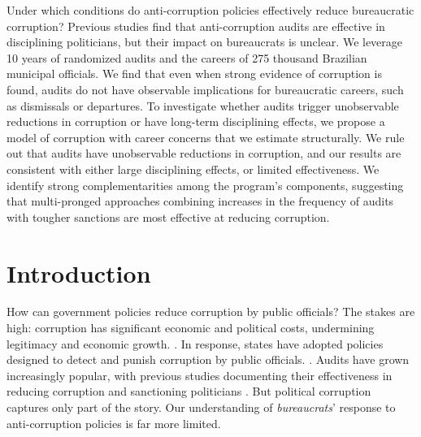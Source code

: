 
    Under which conditions do anti-corruption policies effectively reduce bureaucratic corruption? Previous studies find that anti-corruption audits are effective in disciplining politicians, but their impact on bureaucrats is unclear. We leverage 10 years of randomized audits and the careers of 275 thousand Brazilian municipal officials. We find that even when strong evidence of corruption is found, audits do not have observable implications for bureaucratic careers, such as dismissals or departures. To investigate whether audits trigger unobservable reductions in corruption or have long-term disciplining effects, we propose a model of corruption with career concerns that we estimate structurally. We rule out that audits have unobservable reductions in corruption, and our results are consistent with either large disciplining effects, or limited effectiveness. We identify strong complementarities among the program’s components, suggesting that multi-pronged approaches combining increases in the frequency of audits with tougher sanctions are most effective at reducing corruption. 

\newpage

\section{Introduction}
\label{sec:intro}

How can government policies reduce corruption by public officials? The stakes are high: corruption has significant economic and political costs, undermining legitimacy and economic growth. \citep[e.g.][]{RoseAckerman2016, Rothstein2011,fisman_are_2007}. In response, states have adopted policies designed to detect and punish corruption by public officials. \citep{chen2018busting}. Audits have grown increasingly popular, with previous studies documenting their effectiveness in reducing corruption and sanctioning politicians \citep{nyblade2008cheats, ferraz_electoral_2011,bobonis2016}. But political corruption captures only part of the story. Our understanding of \emph{bureaucrats}' response to anti-corruption policies is far more limited.

